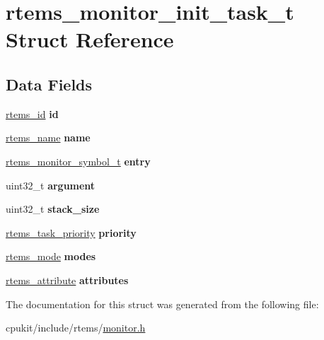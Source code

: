 \hypertarget{structrtems__monitor__init__task__t}{}\section{rtems\+\_\+monitor\+\_\+init\+\_\+task\+\_\+t Struct Reference}
\label{structrtems__monitor__init__task__t}
\subsection*{Data Fields}
\begin{DoxyCompactItemize}
\item 
\mbox{\label{structrtems__monitor__init__task__t_ad72db58f31a2b0474648f10695144d63}} 
\mbox{\hyperlink{group__ClassicTasks_gab20892b814dced7dd4e5b9bf42becd57}{rtems\+\_\+id}} {\bfseries id}
\item 
\mbox{\label{structrtems__monitor__init__task__t_a91490ec6fb09463540edbcc7e8f72473}} 
\mbox{\hyperlink{group__ClassicTasks_ga55fb63c49f68c0cbd9bee004da15b1fd}{rtems\+\_\+name}} {\bfseries name}
\item 
\mbox{\label{structrtems__monitor__init__task__t_a9ea05cbfd6a76b9ce52695d01f9ef219}} 
\mbox{\hyperlink{structrtems__monitor__symbol__t}{rtems\+\_\+monitor\+\_\+symbol\+\_\+t}} {\bfseries entry}
\item 
\mbox{\label{structrtems__monitor__init__task__t_a4730fffabae5f1614daa8056a1ad5211}} 
uint32\+\_\+t {\bfseries argument}
\item 
\mbox{\label{structrtems__monitor__init__task__t_a1b11cc45556d84d97eb3604154fae7e6}} 
uint32\+\_\+t {\bfseries stack\+\_\+size}
\item 
\mbox{\label{structrtems__monitor__init__task__t_a3c8abb1656bd6ff56600ee5b242f736d}} 
\mbox{\hyperlink{group__ClassicTasks_gaa80a0c0938307d1e99d0eb5fee765b47}{rtems\+\_\+task\+\_\+priority}} {\bfseries priority}
\item 
\mbox{\label{structrtems__monitor__init__task__t_a428cc5cb949b898cf07eb44642ec77a3}} 
\mbox{\hyperlink{group__ClassicModes_ga8d46a41a837840dc97336fdcd20e4f68}{rtems\+\_\+mode}} {\bfseries modes}
\item 
\mbox{\label{structrtems__monitor__init__task__t_a1f63ff47ad44b8502c0404666012eb69}} 
\mbox{\hyperlink{group__ClassicAttributes_gaea40313cf78ed843e09c4315d0a10f79}{rtems\+\_\+attribute}} {\bfseries attributes}
\end{DoxyCompactItemize}


The documentation for this struct was generated from the following file\+:\begin{DoxyCompactItemize}
\item 
cpukit/include/rtems/\mbox{\hyperlink{monitor_8h}{monitor.\+h}}\end{DoxyCompactItemize}
